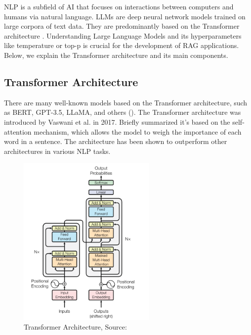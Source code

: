 

NLP is a subfield of AI that focuses on interactions between computers and humans via natural language. LLMs are deep neural network models trained on large corpora of text data. They are predominantly based on the Transformer architecture \citet{Wolf.09.10.2019}. Understanding Large Language Models and its hyperparameters like temperature or top-p is crucial for the development of RAG applications. Below, we explain the Transformer architecture and its main components.

\subsection{Transformer Architecture}
There are many well-known models based on the Transformer architecture, such as BERT, GPT-3.5, LLaMA, and others (\citet{Yin.2024}). The Transformer architecture was introduced by Vaswani et al. in 2017. Briefly summarized it's based on the self-attention mechanism, which allows the model to weigh the importance of each word in a sentence. The architecture has been shown to outperform other architectures in various NLP tasks.

\begin{figure}[!ht]
    \centering
    \includegraphics[width=0.6\textwidth]{images/transformers_architecture.png}
    \caption{Transformer Architecture, Source: \citet{vaswani2023attentionneed}}
    \label{fig:transformer_architecture}
\end{figure}

